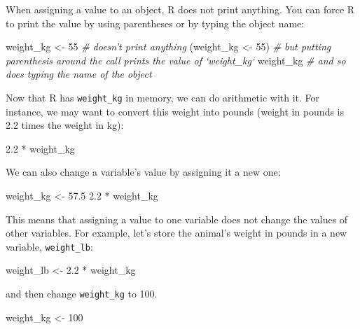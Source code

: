 \documentclass[]{book}
\newenvironment{Shaded}{\begin{snugshade}}{\end{snugshade}}
\newcommand{\DecValTok}[1]{\textcolor[rgb]{0.00,0.00,0.81}{{#1}}}
\newcommand{\FloatTok}[1]{\textcolor[rgb]{0.00,0.00,0.81}{{#1}}}
\newcommand{\StringTok}[1]{\textcolor[rgb]{0.31,0.60,0.02}{{#1}}}
\newcommand{\CommentTok}[1]{\textcolor[rgb]{0.56,0.35,0.01}{\textit{{#1}}}}
\newcommand{\NormalTok}[1]{{#1}}
\theoremstyle{definition}
\theoremstyle{definition}
\theoremstyle{remark}
\begin{document}
When assigning a value to an object, R does not print anything. You can
force R to print the value by using parentheses or by typing the object
name:

\begin{Shaded}
\begin{Highlighting}[]
\NormalTok{weight_kg <-}\StringTok{ }\DecValTok{55}    \CommentTok{# doesn't print anything}
\NormalTok{(weight_kg <-}\StringTok{ }\DecValTok{55}\NormalTok{)  }\CommentTok{# but putting parenthesis around the call prints the value of `weight_kg`}
\NormalTok{weight_kg          }\CommentTok{# and so does typing the name of the object}
\end{Highlighting}
\end{Shaded}

Now that R has \texttt{weight\_kg} in memory, we can do arithmetic with
it. For instance, we may want to convert this weight into pounds (weight
in pounds is 2.2 times the weight in kg):

\begin{Shaded}
\begin{Highlighting}[]
\FloatTok{2.2} \NormalTok{*}\StringTok{ }\NormalTok{weight_kg}
\end{Highlighting}
\end{Shaded}

We can also change a variable's value by assigning it a new one:

\begin{Shaded}
\begin{Highlighting}[]
\NormalTok{weight_kg <-}\StringTok{ }\FloatTok{57.5}
\FloatTok{2.2} \NormalTok{*}\StringTok{ }\NormalTok{weight_kg}
\end{Highlighting}
\end{Shaded}

This means that assigning a value to one variable does not change the
values of other variables. For example, let's store the animal's weight
in pounds in a new variable, \texttt{weight\_lb}:

\begin{Shaded}
\begin{Highlighting}[]
\NormalTok{weight_lb <-}\StringTok{ }\FloatTok{2.2} \NormalTok{*}\StringTok{ }\NormalTok{weight_kg}
\end{Highlighting}
\end{Shaded}

and then change \texttt{weight\_kg} to 100.

\begin{Shaded}
\begin{Highlighting}[]
\NormalTok{weight_kg <-}\StringTok{ }\DecValTok{100}
\end{Highlighting}
\end{Shaded}
\end{document}
